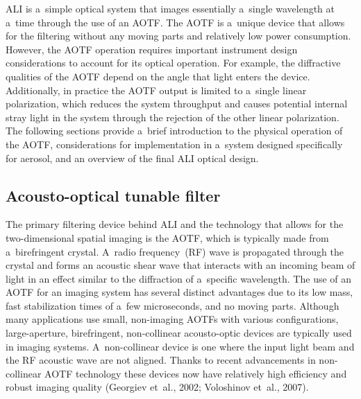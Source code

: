\documentclass[amt]{copernicus}
\begin{document}
ALI is a~simple optical system that images essentially a~single
wavelength at a~time through the use of an AOTF. The AOTF is a~unique device that allows for the
filtering without any moving parts and relatively low power
consumption. However, the AOTF operation requires important instrument
design considerations to account for its optical operation. For
example, the diffractive qualities of the AOTF depend on the angle
that light enters the device. Additionally, in practice the AOTF
output is limited to a~single linear polarization, which reduces the
system throughput and causes potential internal stray light in the
system through the rejection of the other linear polarization. The
following sections provide a~brief introduction to the physical
operation of the AOTF, considerations for implementation in a~system
designed specifically for aerosol, and an overview of the final ALI
optical design.

\subsection{Acousto-optical tunable filter}

The primary filtering device behind ALI and the technology that allows
for the two-dimensional spatial imaging is the AOTF, which is
typically made from a~birefringent crystal. A~radio frequency~(RF)
wave is propagated through the crystal and forms an acoustic shear
wave that interacts with an incoming beam of light in an effect
similar to the diffraction of a~specific wavelength. The use of an
AOTF for an imaging system has several distinct advantages due to its
low mass, fast stabilization times of a~few microseconds, and no
moving parts. Although many applications use small, non-imaging AOTFs
with various configurations, large-aperture, birefringent,
non-collinear acousto-optic devices are typically used in imaging
systems. A~non-collinear device is one where the input light beam and
the RF acoustic wave are not aligned. Thanks to recent advancements in
non-collinear AOTF technology these devices now have relatively high
efficiency and robust imaging quality (Georgiev et~al., 2002;
Voloshinov et~al., 2007).
\end{document}
